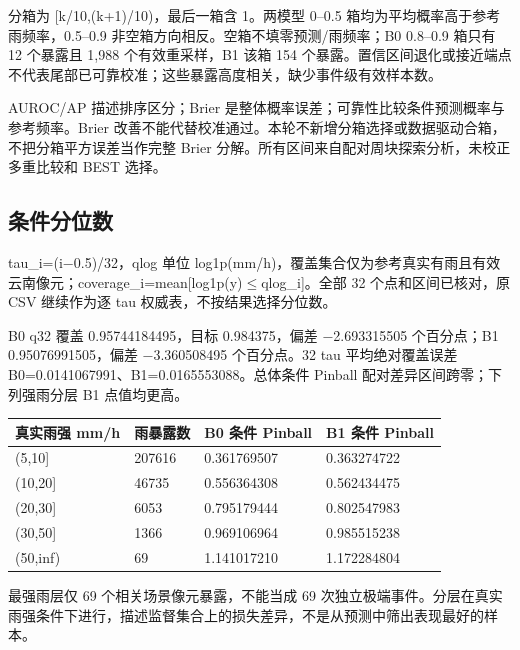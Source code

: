 \documentclass[UTF8,a4paper,10pt,fontset=fandol]{ctexart}
\begin{document}
分箱为 [k/10,(k+1)/10)，最后一箱含 1。两模型 0–0.5 箱均为平均概率高于参考雨频率，0.5–0.9 非空箱方向相反。空箱不填零预测/雨频率；B0 0.8–0.9 箱只有 12 个暴露且 1,988 个有效重采样，B1 该箱 154 个暴露。置信区间退化或接近端点不代表尾部已可靠校准；这些暴露高度相关，缺少事件级有效样本数。\par

AUROC/AP 描述排序区分；Brier 是整体概率误差；可靠性比较条件预测概率与参考频率。Brier 改善不能代替校准通过。本轮不新增分箱选择或数据驱动合箱，不把分箱平方误差当作完整 Brier 分解。所有区间来自配对周块探索分析，未校正多重比较和 BEST 选择。\par

\subsection*{条件分位数}

tau\_\allowbreak{}i=(i−0.5)/32，qlog 单位 log1p(mm/h)，覆盖集合仅为参考真实有雨且有效云南像元；coverage\_\allowbreak{}i=mean[log1p(y)\(\le\)qlog\_\allowbreak{}i]。全部 32 个点和区间已核对，原 CSV 继续作为逐 tau 权威表，不按结果选择分位数。\par

B0 q32 覆盖 0.95744184495，目标 0.984375，偏差 −2.693315505 个百分点；B1 0.95076991505，偏差 −3.360508495 个百分点。32 tau 平均绝对覆盖误差 B0=0.0141067991、B1=0.0165553088。总体条件 Pinball 配对差异区间跨零；下列强雨分层 B1 点值均更高。\par

\begin{center}\scriptsize\begin{longtable}{@{}p{\dimexpr(\linewidth-6\tabcolsep)/4\relax}p{\dimexpr(\linewidth-6\tabcolsep)/4\relax}p{\dimexpr(\linewidth-6\tabcolsep)/4\relax}p{\dimexpr(\linewidth-6\tabcolsep)/4\relax}@{}}\toprule
真实雨强 mm/h & 雨暴露数 & B0 条件 Pinball & B1 条件 Pinball\\
\midrule\endhead
(5,10] & 207616 & 0.361769507 & 0.363274722\\
(10,20] & 46735 & 0.556364308 & 0.562434475\\
(20,30] & 6053 & 0.795179444 & 0.802547983\\
(30,50] & 1366 & 0.969106964 & 0.985515238\\
(50,inf) & 69 & 1.141017210 & 1.172284804\\
\bottomrule\end{longtable}\end{center}\normalsize

最强雨层仅 69 个相关场景像元暴露，不能当成 69 次独立极端事件。分层在真实雨强条件下进行，描述监督集合上的损失差异，不是从预测中筛出表现最好的样本。\par
\end{document}

